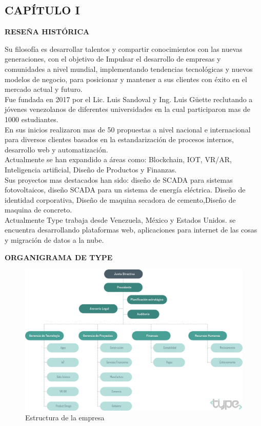 \begin{center}
    \section*{CAPÍTULO I}
    \vspace*{0.5in}
    \textbf{RESEÑA HISTÓRICA}
\end{center}

Su filosofía es desarrollar talentos y compartir 
conocimientos con las nuevas generaciones, 
con el objetivo de Impulsar el desarrollo de empresas y comunidades a nivel mundial, implementando 
tendencias tecnológicas y nuevos modelos de negocio, para posicionar y mantener a sus clientes con éxito en el 
mercado actual y futuro.\\
 
Fue fundada en 2017 por el Lic. Luis Sandoval 
y Ing. Luis Güette  reclutando a jóvenes venezolanos 
de diferentes universidades en la cual participaron mas de 
1000 estudiantes.\\

En sus inicios realizaron mas de 50 propuestas a nivel 
nacional e internacional para diversos clientes basados 
en la estandarización de procesos internos, desarrollo web 
y automatización.\\

Actualmente se han expandido a áreas como: Blockchain, IOT, 
VR/AR, Inteligencia artificial, Diseño de Productos y 
Finanzas.\\

Sus proyectos mas destacados han sido: diseño de SCADA 
para sistemas fotovoltaicos, diseño SCADA para un sistema 
de energía eléctrica. Diseño de identidad corporativa, 
Diseño de maquina secadora de cemento,Diseño de maquina de 
concreto.\\

Actualmente Type trabaja desde Venezuela, México y Estados 
Unidos. se encuentra desarrollando plataformas web, 
aplicaciones para internet de las cosas y migración de datos a la nube. 
\\                      

\begin{center}
    \textbf{ORGANIGRAMA DE TYPE}
\end{center}

\begin{figure}[H]
    \centering
        \includegraphics[scale=0.5]
        {Organigrama_type_07082019.png}
    \caption{Estructura de la empresa}
    \label{fig:my_label}
\end{figure}

\newpage